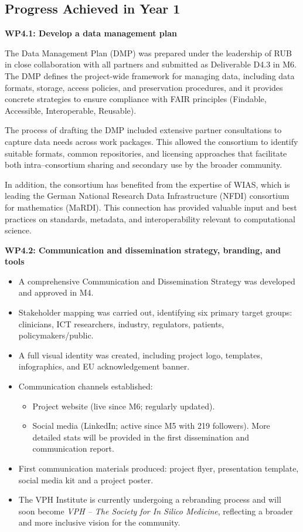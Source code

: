 \documentclass[a4paper,12pt, numbers]{article}
\begin{document}
\subsection{Progress Achieved in Year 1} %

\noindent\textbf{WP4.1: Develop a data management plan}

The Data Management Plan (DMP) was prepared under the leadership of RUB in close collaboration with all partners and submitted as Deliverable D4.3 in M6. The DMP defines the project-wide framework for managing data, including data formats, storage, access policies, and preservation procedures, and it provides concrete strategies to ensure compliance with FAIR principles (Findable, Accessible, Interoperable, Reusable).  

The process of drafting the DMP included extensive partner consultations to capture data needs across work packages. This allowed the consortium to identify suitable formats, common repositories, and licensing approaches that facilitate both intra--consortium sharing and secondary use by the broader community.  

In addition, the consortium has benefited from the expertise of WIAS, which is leading the German National Research Data Infrastructure (NFDI) consortium for mathematics (MaRDI). This connection has provided valuable input and best practices on standards, metadata, and interoperability relevant to computational science.  



\noindent\textbf{WP4.2: Communication and dissemination strategy, branding, and tools}

\begin{itemize}[left=1em, itemsep=0pt, topsep=0pt]
\item A comprehensive Communication and Dissemination Strategy was developed and approved in M4.
\item Stakeholder mapping was carried out, identifying six primary target groups: clinicians, ICT researchers, industry, regulators, patients, policymakers/public.
\item A full visual identity was created, including project logo, templates, infographics, and EU acknowledgement banner.
\item Communication channels established:
\begin{itemize}[left=1em, itemsep=0pt, topsep=0pt]
\item Project website (live since M6; regularly updated).
\item Social media (LinkedIn; active since M5 with 219 followers). More detailed stats will be provided in the first dissemination and communication report.
\end{itemize}
\item First communication materials produced: project flyer, presentation template, social media kit and a project poster.
\item The VPH Institute is currently undergoing a rebranding process and will soon become \textit{VPH – The Society for In Silico Medicine}, reflecting a broader and more inclusive vision for the community.
\end{itemize}
\end{document}

